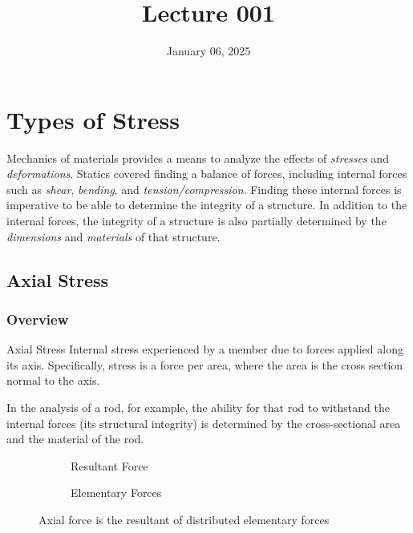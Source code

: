 \documentclass[12pt]{article}
\title{Lecture 001}
\date{January 06, 2025}
\begin{document}
\section{Types of Stress}
\label{sec:typesOfStress}

Mechanics of materials provides a means to analyze the effects of \textit{stresses} and \textit{deformations}. Statics covered finding a balance of forces, including internal forces such as \textit{shear}, \textit{bending}, and \textit{tension/compression}. Finding these internal forces is imperative to be able to determine the integrity of a structure. In addition to the internal forces, the integrity of a structure is also partially determined by the \textit{dimensions} and \textit{materials} of that structure.

\subsection{Axial Stress}
\label{ssec:axialStress}

\subsubsection{Overview}

\begin{definition}{Axial Stress}
  Internal stress experienced by a member due to forces applied along its axis. Specifically, stress is a force per area, where the area is the cross section normal to the axis.
\end{definition}

In the analysis of a rod, for example, the ability for that rod to withstand the internal forces (its structural integrity) is determined by the cross-sectional area and the material of the rod.

\begin{figure}[H]
  \centering
  \begin{subfigure}[H]{0.45\textwidth}
    \centering
    
    \caption{Resultant Force}
    \label{fig:001}
  \end{subfigure}
  \begin{subfigure}[H]{0.45\textwidth}
    \centering
    
    \caption{Elementary Forces}
    \label{fig:002}
  \end{subfigure}
  \caption{Axial force is the resultant of distributed elementary forces}
  \label{fig:axialVsElementary}
\end{figure}
\end{document}
